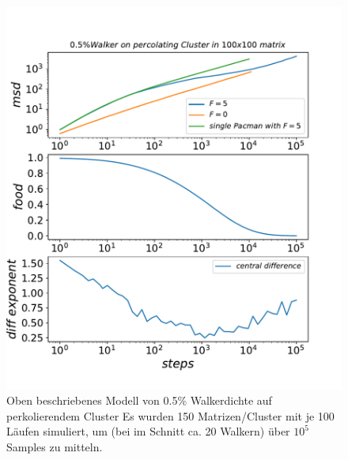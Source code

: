 \documentclass[a4paper, 12pt]{report}
\begin{document}
\begin{figure}[H]
	\centering
	\includegraphics[scale=0.75]{05percent_on_pc.pdf}
	\caption{Oben beschriebenes Modell von 0.5\% Walkerdichte auf perkolierendem Cluster \break
		Es wurden 150 Matrizen/Cluster mit je 100 Läufen simuliert, um (bei im Schnitt ca. 20 Walkern) über $10^5$ Samples zu mitteln.}
\end{figure}

\clearpage
\end{document}
